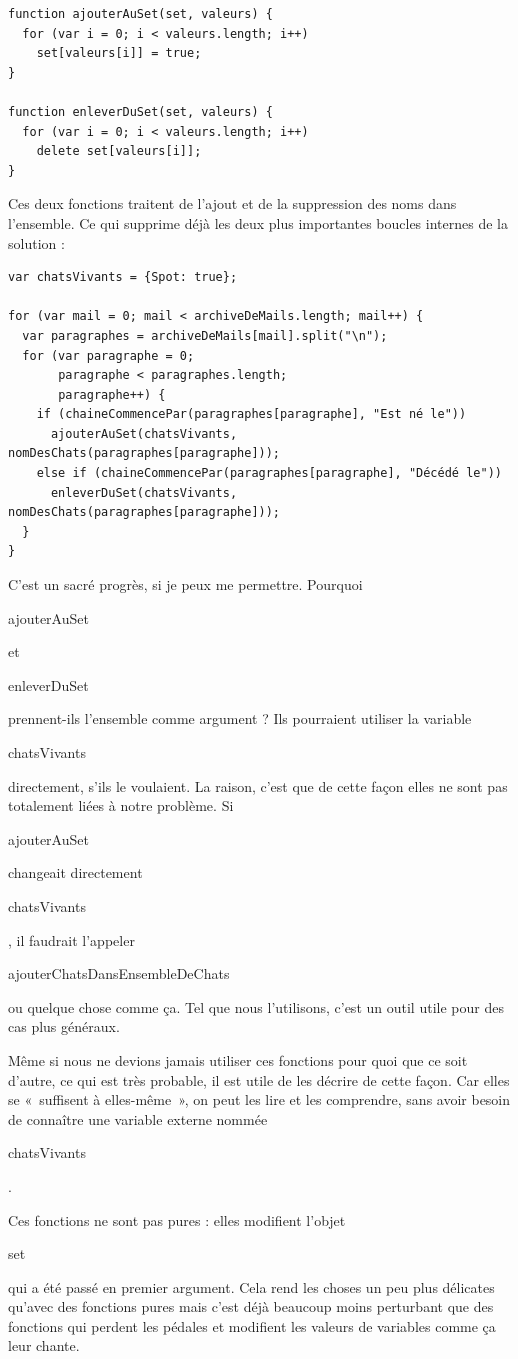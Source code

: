 \documentclass{FramateX}
\renewcommand{\texttt}[1]{\begin{sffamily}{#1}\end{sffamily}}
\begin{document}
\begin{lstlisting}
function ajouterAuSet(set, valeurs) {
  for (var i = 0; i < valeurs.length; i++)
    set[valeurs[i]] = true;
}

function enleverDuSet(set, valeurs) {
  for (var i = 0; i < valeurs.length; i++)
    delete set[valeurs[i]];
}
\end{lstlisting}
Ces deux fonctions traitent de l'ajout et de la suppression des noms
dans l'ensemble. Ce qui supprime déjà les deux plus importantes boucles
internes de la solution :

\begin{lstlisting}
var chatsVivants = {Spot: true};

for (var mail = 0; mail < archiveDeMails.length; mail++) {
  var paragraphes = archiveDeMails[mail].split("\n");
  for (var paragraphe = 0;
       paragraphe < paragraphes.length;
       paragraphe++) {
    if (chaineCommencePar(paragraphes[paragraphe], "Est né le"))
      ajouterAuSet(chatsVivants, nomDesChats(paragraphes[paragraphe]));
    else if (chaineCommencePar(paragraphes[paragraphe], "Décédé le"))
      enleverDuSet(chatsVivants, nomDesChats(paragraphes[paragraphe]));
  }
}
\end{lstlisting}
C'est un sacré progrès, si je peux me permettre. Pourquoi
\texttt{ajouterAuSet} et \texttt{enleverDuSet} prennent-ils l'ensemble
comme argument ? Ils pourraient utiliser la variable
\texttt{chatsVivants} directement, s'ils le voulaient. La raison, c'est
que de cette façon elles ne sont pas totalement liées à notre problème.
Si \texttt{ajouterAuSet} changeait directement \texttt{chatsVivants}, il
faudrait l'appeler \texttt{ajouterChatsDansEnsembleDeChats} ou quelque
chose comme ça. Tel que nous l'utilisons, c'est un outil utile pour des
cas plus généraux.

Même si nous ne devions jamais utiliser ces fonctions pour quoi que ce
soit d'autre, ce qui est très probable, il est utile de les décrire de
cette façon. Car elles se «~suffisent à elles-même~», on peut les lire
et les comprendre, sans avoir besoin de connaître une variable externe
nommée \texttt{chatsVivants}.

Ces fonctions ne sont pas pures : elles modifient l'objet \texttt{set}
qui a été passé en premier argument. Cela rend les choses un peu plus
délicates qu'avec des fonctions pures mais c'est déjà beaucoup moins
perturbant que des fonctions qui perdent les pédales et modifient les
valeurs de variables comme ça leur chante.

\begin{center}\end{center}
\end{document}
